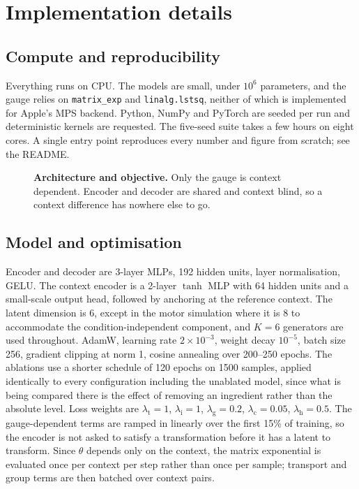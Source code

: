 \section{Implementation details}
\label{app:details}

\subsection{Compute and reproducibility}

Everything runs on CPU. The models are small, under $10^6$ parameters, and the
gauge relies on \texttt{matrix\_exp} and \texttt{linalg.lstsq}, neither of which
is implemented for Apple's MPS backend. Python, NumPy and PyTorch are seeded per
run and deterministic kernels are requested. The five-seed suite takes a few
hours on eight cores. A single entry point reproduces every number and figure
from scratch; see the README.

\begin{figure}[t]
  \centering
  \caption{\textbf{Architecture and objective.} Only the gauge is context
  dependent. Encoder and decoder are shared and context blind, so a context
  difference has nowhere else to go.}
  \label{fig:architecture}
\end{figure}

\subsection{Model and optimisation}

Encoder and decoder are 3-layer MLPs, 192 hidden units, layer normalisation,
GELU. The context encoder is a 2-layer $\tanh$ MLP with 64 hidden units and a
small-scale output head, followed by anchoring at the reference context. The
latent dimension is 6, except in the motor simulation where it is 8 to
accommodate the condition-independent component, and $K=6$ generators are used
throughout. AdamW, learning rate $2\times10^{-3}$, weight decay $10^{-5}$, batch
size 256, gradient clipping at norm 1, cosine annealing over 200--250 epochs.
The ablations use a shorter schedule of 120 epochs on 1500 samples, applied
identically to every configuration including the unablated model, since what is
being compared there is the effect of removing an ingredient rather than the
absolute level.
Loss weights are $\lambda_{\mathrm{t}}=1$, $\lambda_{\mathrm{i}}=1$,
$\lambda_{\mathrm{g}}=0.2$, $\lambda_{\mathrm{c}}=0.05$,
$\lambda_{\mathrm{h}}=0.5$. The gauge-dependent terms are ramped in linearly over
the first 15\% of training, so the encoder is not asked to satisfy a
transformation before it has a latent to transform. Since $\theta$ depends only
on the context, the matrix exponential is evaluated once per context per step
rather than once per sample; transport and group terms are then batched over
context pairs.

